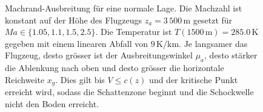 \begin{figure}
    \centering
{}
    \caption{Machrand-Ausbreitung für eine normale Lage. Die Machzahl
    ist konstant auf der Höhe des Flugzeugs $z_a=3\,500$\,m gesetzt für
    $\textit{Ma} \in \{1.05, 1.1, 1.5, 2.5 \}$.
    Die Temperatur ist $T(1500\,\mathrm{m}) = 285.0\,\mathrm{K}$ gegeben mit einem
    linearen Abfall von $9\,\mathrm{K/km}$.
    Je langsamer das Flugzeug, desto grösser ist der Ausbreitungswinkel
    $\mu_a$, desto stärker die Ablenkung nach oben und desto grösser
    die horizontale Reichweite $x_g$.
    Dies gilt bis $V\le c(z)$ und der kritische Punkt erreicht wird,
    sodass die Schattenzone beginnt und die Schockwelle nicht den
    Boden erreicht.}
    \label{fig:schall:norm-lage}
\end{figure}

